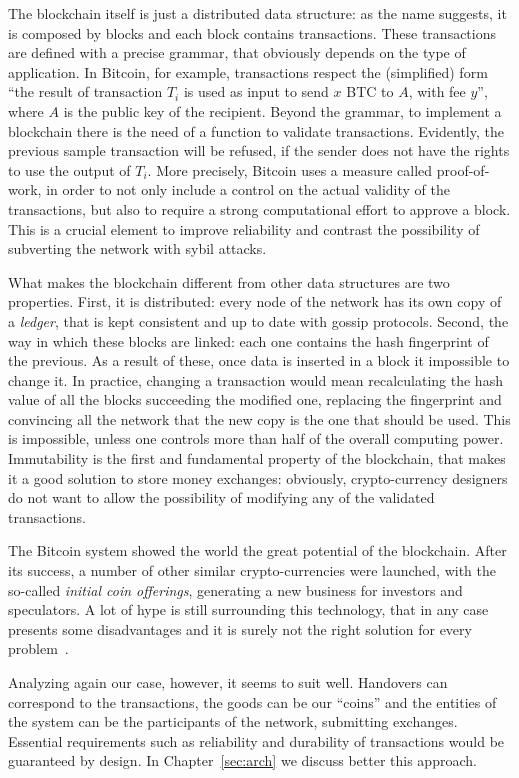 The blockchain itself is just a distributed data structure: as the name suggests, it is composed by blocks and each block contains transactions. These transactions are defined with a precise grammar, that obviously depends on the type of application. In Bitcoin, for example, transactions respect the (simplified) form ``the result of transaction $T_i$ is used as input to send $x$ BTC to $A$, with fee $y$'', where $A$ is the public key of the recipient. Beyond the grammar, to implement a blockchain there is the need of a function to validate transactions. Evidently, the previous sample transaction will be refused, if the sender does not have the rights to use the output of $T_i$. More precisely, Bitcoin uses a measure called proof-of-work, in order to not only include a control on the actual validity of the transactions, but also to require a strong computational effort to approve a block. This is a crucial element to improve reliability and contrast the possibility of subverting the network with sybil attacks.

What makes the blockchain different from other data structures are two properties. First, it is distributed: every node of the network has its own copy of a \emph{ledger}, that is kept consistent and up to date with gossip protocols. Second, the way in which these blocks are linked: each one contains the hash fingerprint of the previous. As a result of these, once data is inserted in a block it impossible to change it. In practice, changing a transaction would mean recalculating the hash value of all the blocks succeeding the modified one, replacing the fingerprint and convincing all the network that the new copy is the one that should be used. This is impossible, unless one controls more than half of the overall computing power. Immutability is the first and fundamental property of the blockchain, that makes it a good solution to store money exchanges: obviously, crypto-currency designers do not want to allow the possibility of modifying any of the validated transactions.

The Bitcoin system showed the world the great potential of the blockchain. After its success, a number of other similar crypto-currencies were launched, with the so-called \emph{initial coin offerings}, generating a new business for investors and speculators. A lot of hype is still surrounding this technology, that in any case presents some disadvantages and it is surely not the right solution for every problem~\cite{noblockchain}. 

Analyzing again our case, however, it seems to suit well. Handovers can correspond to the transactions, the goods can be our ``coins'' and the entities of the system can be the participants of the network, submitting exchanges. Essential requirements such as reliability and durability of transactions would be guaranteed by design. In Chapter~\ref{sec:arch} we discuss better this approach.

